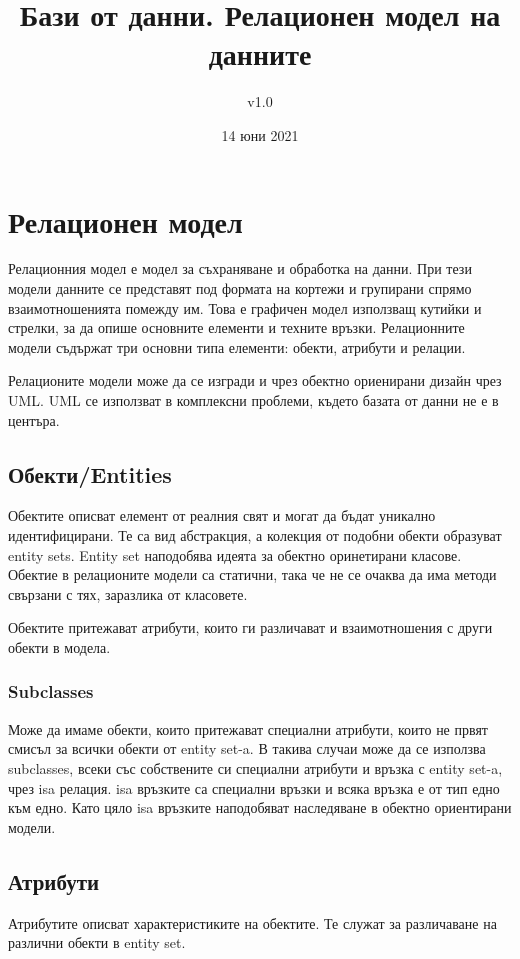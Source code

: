 \documentclass[fleqn,12pt]{article}
\title{Бази от данни. Релационен модел на данните}
\author{v1.0}
\date{14 юни 2021}
\begin{document}
\maketitle

\tableofcontents

\section{Релационен модел}
    Релационния модел е модел за съхраняване и обработка на данни. При тези модели данните се представят под формата на кортежи и групирани спрямо взаимотношенията помежду им. Това е графичен модел използващ кутийки и стрелки, за да опише основните елементи и техните връзки. Релационните модели съдържат три основни типа елементи: обекти, атрибути и релации. 

    Релационите модели може да се изгради и чрез обектно ориенирани дизайн чрез UML. UML се използват в комплексни проблеми, където базата от данни не е в центъра.


\subsection{Обекти/Entities}
    Обектите описват елемент от реалния свят и могат да бъдат уникално идентифицирани. Те са вид абстракция, а колекция от подобни обекти образуват entity sets. Entity set наподобява идеята за обектно оринетирани класове. Обектие в релационите модели са статични, така че не се очаква да има методи свързани с тях, заразлика от класовете.

    Обектите притежават атрибути, които ги различават и взаимотношения с други обекти в модела.


\subsubsection{Subclasses}
    Може да имаме обекти, които притежават специални атрибути, които не првят смисъл за всички обекти от entity set-a. В такива случаи може да се използва subclasses, всеки със собствените си специални атрибути и връзка с entity set-a, чрез isa релация. isa връзките са специални връзки и всяка връзка е от тип едно към едно. Като цяло isa връзките наподобяват наследяване в обектно ориентирани модели.


\subsection{Атрибути}
    Атрибутите описват характеристиките на обектите. Те служат за различаване на различни обекти в entity set.
\end{document}

